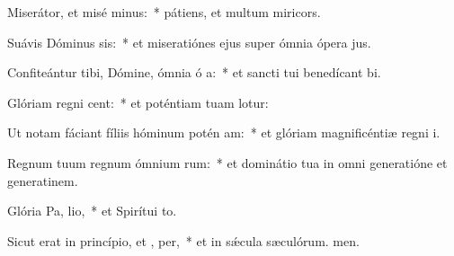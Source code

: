 \item Miserátor, et misé minus:~* pátiens, et multum miricors.
\item Suávis Dóminus sis:~* et miseratiónes ejus super ómnia ópera jus.
\item Confiteántur tibi, Dómine, ómnia ó a:~* et sancti tui benedícant bi.
\item Glóriam regni  cent:~* et poténtiam tuam lotur:
\item Ut notam fáciant fíliis hóminum potén am:~* et glóriam magnificéntiæ regni i.
\item Regnum tuum regnum ómnium rum:~* et dominátio tua in omni generatióne et generatinem.
\item Glória Pa,  lio,~* et Spirítui to.
\item Sicut erat in princípio, et ,  per,~* et in sǽcula sæculórum. men.
